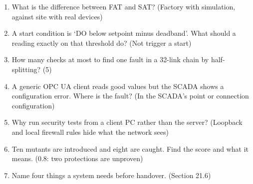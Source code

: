 \begin{enumerate}
\item What is the difference between FAT and SAT? (Factory with simulation, against site with real devices)
\item A start condition is ‘DO below setpoint minus deadband’. What should a reading exactly on that threshold do? (Not trigger a start)
\item How many checks at most to find one fault in a 32-link chain by half-splitting? (5)
\item A generic OPC UA client reads good values but the SCADA shows a configuration error. Where is the fault? (In the SCADA's point or connection configuration)
\item Why run security tests from a client PC rather than the server? (Loopback and local firewall rules hide what the network sees)
\item Ten mutants are introduced and eight are caught. Find the score and what it means. (0.8: two protections are unproven)
\item Name four things a system needs before handover. (Section 21.6)
\end{enumerate}
